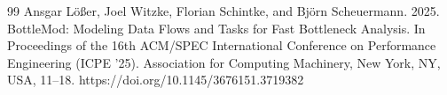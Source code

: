 \documentclass[11pt,a4paper]{article}
\begin{document}
\begin{thebibliography}{99}
	Ansgar Lößer, Joel Witzke, Florian Schintke, and Björn Scheuermann. 2025. BottleMod: Modeling Data Flows and Tasks for Fast Bottleneck Analysis. In Proceedings of the 16th ACM/SPEC International Conference on Performance Engineering (ICPE '25). Association for Computing Machinery, New York, NY, USA, 11–18. https://doi.org/10.1145/3676151.3719382

\end{thebibliography}
\end{document}
